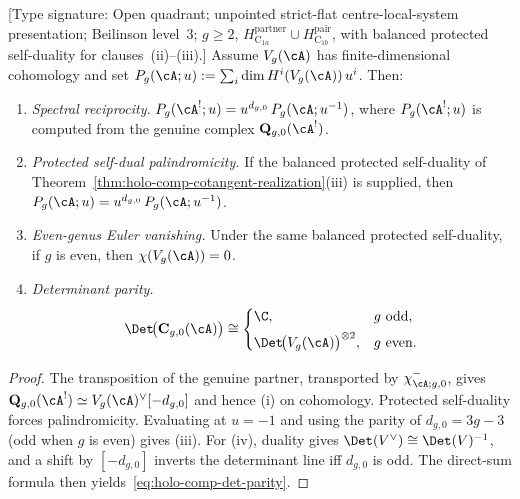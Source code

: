 \begin{corollary}
\label{cor:holo-comp-spectral-reciprocity}
\textup{[Type signature: Open quadrant; unpointed strict-flat
centre-local-system presentation; Beilinson level~3; \(g\geq2\),
\(H_{\mathrm C_{1a}}^{\mathrm{partner}}\cup
H_{\mathrm C_{1b}}^{\mathrm{pair}}\), with balanced protected
self-duality for clauses~\textup{(ii)--(iii)}.]}
Assume $V_g(\cA)$ has finite-dimensional cohomology and set
$P_g(\cA; u) := \sum_i \dim H^i(V_g(\cA))\, u^i$. Then:
\begin{enumerate}[label=\textup{(\roman*)}]
\item \emph{Spectral reciprocity.}\;
 $P_g(\cA^!; u) = u^{d_{g,0}}\, P_g(\cA; u^{-1})$,
 where $P_g(\cA^!;u)$ is computed from the genuine complex
 $\mathbf Q_{g,0}(\cA^!)$.
\item \emph{Protected self-dual palindromicity.}\;
 If the balanced protected self-duality of
 Theorem~\textup{\ref{thm:holo-comp-cotangent-realization}(iii)} is
 supplied, then
 $P_g(\cA; u) = u^{d_{g,0}}\, P_g(\cA; u^{-1})$.
\item \emph{Even-genus Euler vanishing.}\;
 Under the same balanced protected self-duality, if $g$ is even, then
 $\chi(V_g(\cA)) = 0$.
\item \emph{Determinant parity.}\;
 \begin{equation}\label{eq:holo-comp-det-parity}
 \Det\!\bigl(\mathbf{C}_{g,0}(\cA)\bigr)
 \cong
 \begin{cases}
 \C, & g \text{ odd}, \\[4pt]
 \Det\!\bigl(V_g(\cA)\bigr)^{\otimes 2}, & g \text{ even}.
 \end{cases}
 \end{equation}
\end{enumerate}
\end{corollary}

\begin{proof}
The transposition of the genuine partner, transported by
$\chi^-_{\cA;g,0}$, gives
$\mathbf Q_{g,0}(\cA^!)\simeq V_g(\cA)^\vee[-d_{g,0}]$ and hence (i) on
cohomology. Protected self-duality forces palindromicity.
Evaluating at $u = -1$ and using the parity of $d_{g,0}=3g-3$
(odd when $g$ is even) gives (iii). For (iv), duality gives
$\Det(V^\vee) \cong \Det(V)^{-1}$, and a shift by $[-d_{g,0}]$
inverts the determinant line iff $d_{g,0}$ is odd. The direct-sum
formula then yields~\eqref{eq:holo-comp-det-parity}.
\end{proof}

